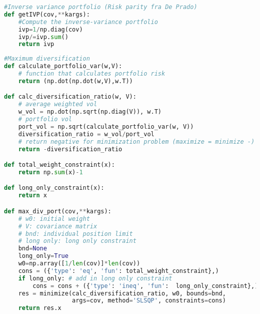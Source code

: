 \begin{lstlisting}[language=Python]
#Inverse variance portfolio (Risk parity fra De Prado)
def getIVP(cov,**kargs):
    #Compute the inverse-variance portfolio
    ivp=1/np.diag(cov)
    ivp/=ivp.sum()
    return ivp
\end{lstlisting}

\begin{lstlisting}[language=Python]
#Maximum diversification
def calculate_portfolio_var(w,V):
    # function that calculates portfolio risk
    return (np.dot(np.dot(w,V),w.T))

def calc_diversification_ratio(w, V):
    # average weighted vol
    w_vol = np.dot(np.sqrt(np.diag(V)), w.T)
    # portfolio vol
    port_vol = np.sqrt(calculate_portfolio_var(w, V))
    diversification_ratio = w_vol/port_vol
    # return negative for minimization problem (maximize = minimize -)
    return -diversification_ratio

def total_weight_constraint(x):
    return np.sum(x)-1

def long_only_constraint(x):
    return x

def max_div_port(cov,**kargs):
    # w0: initial weight
    # V: covariance matrix
    # bnd: individual position limit
    # long only: long only constraint
    bnd=None
    long_only=True
    w0=np.array([1/len(cov)]*len(cov))
    cons = ({'type': 'eq', 'fun': total_weight_constraint},)
    if long_only: # add in long only constraint
        cons = cons + ({'type': 'ineq', 'fun':  long_only_constraint},)
    res = minimize(calc_diversification_ratio, w0, bounds=bnd,
                   args=cov, method='SLSQP', constraints=cons)
    return res.x
\end{lstlisting}

